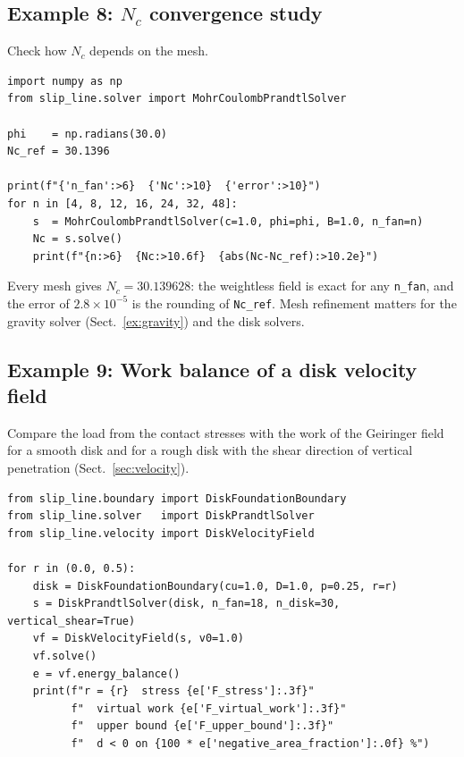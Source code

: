 \documentclass[11pt,a4paper]{article}
\begin{document}
\subsection{Example 8: $N_c$ convergence study}
\label{ex:convergence}

Check how $N_c$ depends on the mesh.

\begin{lstlisting}
import numpy as np
from slip_line.solver import MohrCoulombPrandtlSolver

phi    = np.radians(30.0)
Nc_ref = 30.1396

print(f"{'n_fan':>6}  {'Nc':>10}  {'error':>10}")
for n in [4, 8, 12, 16, 24, 32, 48]:
    s  = MohrCoulombPrandtlSolver(c=1.0, phi=phi, B=1.0, n_fan=n)
    Nc = s.solve()
    print(f"{n:>6}  {Nc:>10.6f}  {abs(Nc-Nc_ref):>10.2e}")
\end{lstlisting}

Every mesh gives $N_c = 30.139628$: the weightless field is exact for
any \texttt{n\_fan}, and the error of $2.8\times10^{-5}$ is the rounding
of \texttt{Nc\_ref}.  Mesh refinement matters for the gravity solver
(Sect.~\ref{ex:gravity}) and the disk solvers.

\subsection{Example 9: Work balance of a disk velocity field}
\label{ex:energy}

Compare the load from the contact stresses with the work of the
Geiringer field for a smooth disk and for a rough disk with the shear
direction of vertical penetration (Sect.~\ref{sec:velocity}).

\begin{lstlisting}
from slip_line.boundary import DiskFoundationBoundary
from slip_line.solver   import DiskPrandtlSolver
from slip_line.velocity import DiskVelocityField

for r in (0.0, 0.5):
    disk = DiskFoundationBoundary(cu=1.0, D=1.0, p=0.25, r=r)
    s = DiskPrandtlSolver(disk, n_fan=18, n_disk=30, vertical_shear=True)
    vf = DiskVelocityField(s, v0=1.0)
    vf.solve()
    e = vf.energy_balance()
    print(f"r = {r}  stress {e['F_stress']:.3f}"
          f"  virtual work {e['F_virtual_work']:.3f}"
          f"  upper bound {e['F_upper_bound']:.3f}"
          f"  d < 0 on {100 * e['negative_area_fraction']:.0f} %")
\end{lstlisting}
\end{document}
